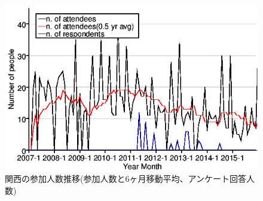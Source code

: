 \documentclass[mingoth,a4paper]{jsarticle}
\begin{document}
%
\begin{figure}[h]
  \begin{center}
    \includegraphics[width=.6\hsize]{image201512/memberanalysis/kansai.png}
  \end{center}
  \caption{関西の参加人数推移(参加人数と6ヶ月移動平均、アンケート回答人数)}
  \label{fig:kansaipeoplechart}
\end{figure}

\end{document}
